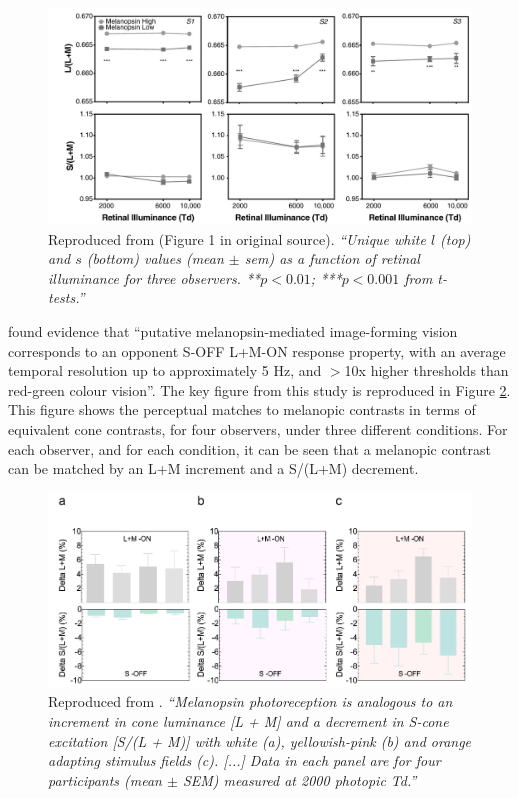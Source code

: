 \begin{figure}[htbp]
\includegraphics[max width=\textwidth, center]{figs/LitRev/cao.png}
\caption{Reproduced from \citet{cao_evidence_2018} (Figure 1 in original source). \textit{``Unique white $l$ (top) and $s$ (bottom) values (mean $\pm$ sem)
as a function of retinal illuminance for three observers. **$p < 0.01$;
***$p < 0.001$ from t-tests.''}}
\label{fig:cao}
\end{figure}

\citet{zele_melanopsin_2018} found evidence that ``putative melanopsin-mediated image-forming vision corresponds to an opponent S-OFF L+M-ON response property, with an average temporal resolution up to approximately 5 Hz, and $>$10x higher thresholds than red-green colour vision''. The key figure from this study is reproduced in Figure \ref{fig:zele}. This figure shows the perceptual matches to melanopic contrasts in terms of equivalent cone contrasts, for four observers, under three different conditions. For each observer, and for each condition, it can be seen that a melanopic contrast can be matched by an L+M increment and a S/(L+M) decrement.

\begin{figure}[htbp]
\includegraphics[max width=\textwidth, center]{figs/LitRev/zele.png}
\caption{Reproduced from \citet{zele_melanopsin_2018}. \textit{``Melanopsin photoreception is analogous to an increment in cone luminance [L + M] and a decrement in S-cone excitation [S/(L + M)] with white (a), yellowish-pink (b) and orange adapting stimulus fields (c). [...] Data in each panel are for four participants (mean $\pm$ SEM) measured at 2000 photopic Td.''}}
\label{fig:zele}
\end{figure}

